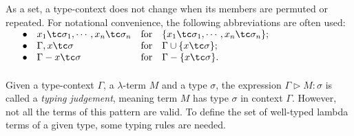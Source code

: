 As a set, a type-context does not change when its members are permuted or repeated. For notational convenience, the following abbreviations are often used:\\
$
\begin{array}{rlll}
\hspace*{12pt} \bullet & x_1 \tc \sigma _1 , \cdots , x_n \tc \sigma _n & \text{for} & \{ x_1 \tc \sigma _1 , \cdots , x_n \tc \sigma _n \} ; \\
\bullet & \Gamma , x \tc \sigma & \text{for} & \Gamma \cup \{ x \tc \sigma \} ; \\
\bullet & \Gamma - x \tc \sigma & \text{for} & \Gamma - \{ x \tc \sigma \} .
\end{array}
$
\\
\\
Given a type-context $ \Gamma $, a $ \lambda $-term $ M $ and a type $ \sigma $, the expression $ \Gamma \triangleright M: \sigma $ is called a \emph{typing judgement}, meaning term $ M $ has type $ \sigma $ in context $ \Gamma $. However, not all the terms of this pattern are valid. To define the set of well-typed lambda terms of a given type, some typing rules are needed.

